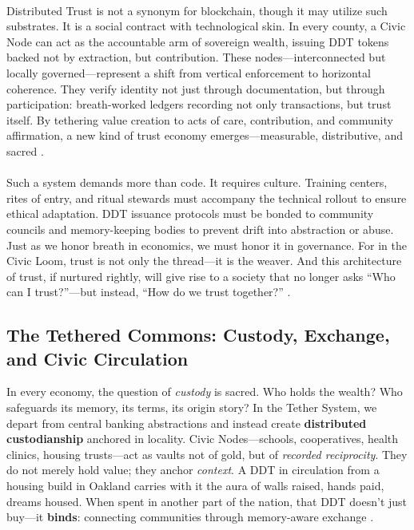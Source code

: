 \documentclass[12pt]{article}
\begin{document}
\paragraph{}Distributed Trust is not a synonym for blockchain, though it may utilize such substrates. It is a social contract with technological skin. In every county, a Civic Node can act as the accountable arm of sovereign wealth, issuing DDT tokens backed not by extraction, but contribution. These nodes—interconnected but locally governed—represent a shift from vertical enforcement to horizontal coherence. They verify identity not just through documentation, but through participation: breath-worked ledgers recording not only transactions, but trust itself. By tethering value creation to acts of care, contribution, and community affirmation, a new kind of trust economy emerges—measurable, distributive, and sacred \cite{piven1993regulating}.

\paragraph{}Such a system demands more than code. It requires culture. Training centers, rites of entry, and ritual stewards must accompany the technical rollout to ensure ethical adaptation. DDT issuance protocols must be bonded to community councils and memory-keeping bodies to prevent drift into abstraction or abuse. Just as we honor breath in economics, we must honor it in governance. For in the Civic Loom, trust is not only the thread—it is the weaver. And this architecture of trust, if nurtured rightly, will give rise to a society that no longer asks ``Who can I trust?''—but instead, ``How do we trust together?'' \cite{brown2022architecture}.


\subsection{The Tethered Commons: Custody, Exchange, and Civic Circulation}

In every economy, the question of \textit{custody} is sacred. Who holds the wealth? Who safeguards its memory, its terms, its origin story? In the Tether System, we depart from central banking abstractions and instead create \textbf{distributed custodianship} anchored in locality. Civic Nodes—schools, cooperatives, health clinics, housing trusts—act as vaults not of gold, but of \textit{recorded reciprocity}. They do not merely hold value; they anchor \textit{context}. A DDT in circulation from a housing build in Oakland carries with it the aura of walls raised, hands paid, dreams housed. When spent in another part of the nation, that DDT doesn’t just buy—it \textbf{binds}: connecting communities through memory-aware exchange \cite{weiner1992inalienable,hyde2019gift}.
\end{document}
